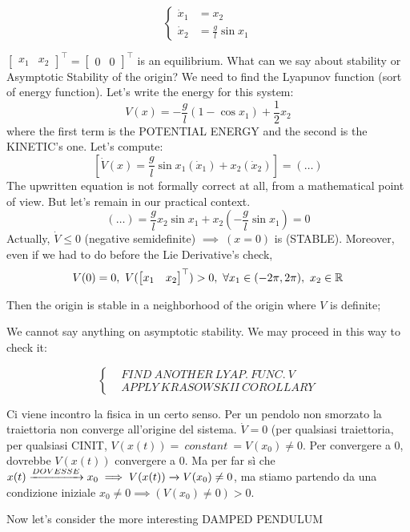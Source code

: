 \[
	\left\{
	\begin{aligned}
	\dot{x}_1 &= x_2 \\
	\dot{x}_2 &= \frac{g}{l}\sin{x_1}
	\end{aligned} 
	\right.
\]

$\begin{bmatrix}x_1 & x_2\end{bmatrix}^\top = \begin{bmatrix}0 & 0\end{bmatrix}^\top$ is an equilibrium. What can  we say about stability or Asymptotic Stability of the origin? We need to find the Lyapunov function (sort of energy function). Let's write the energy for this system:
\[
	V(x) = -\frac{g}{l}(1-\cos{x_1}) + \frac{1}{2}x_2
\]
where the first term is the POTENTIAL ENERGY and the second is the KINETIC's one. Let's compute:
\[ 
	[\dot{V}(x) = \frac{g}{l}\sin{x_1}(\dot{x}_1) + x_2(\dot{x}_2)] = (\dots)
\]
The upwritten equation is not formally correct at all, from a mathematical point of view. But let's remain in our practical context. 
\[
	(\dots) = \frac{g}{l}x_2\sin{x_1} + x_2(-\frac{g}{l}\sin{x_1}) = 0
\]
Actually, $\dot{V} \leq 0$ (negative semidefinite) $\implies\ (x=0)$ is (STABLE). Moreover, even if we had to do before the Lie Derivative's check,
\[
	V(0) = 0,\ V(\begin{bmatrix}x_1 & x_2\end{bmatrix}^\top) > 0,\ \forall x_1 \in (-2\pi,2\pi),\ x_2 \in \mathbb{R}
\] 

Then the origin is stable in a neighborhood of the origin where $V$ is definite;

We cannot say anything on asymptotic stability. We may proceed in this way to check it:

\[
	\left\{
	\begin{aligned}
	&FIND\ ANOTHER\ LYAP.\ FUNC.\ V \\
	&APPLY\ KRASOWSKII\ COROLLARY
	\end{aligned} 
	\right.
\]


Ci viene incontro la fisica in un certo senso. Per un pendolo non smorzato la traiettoria non converge all'origine del sistema. $\dot{V} = 0$ (per qualsiasi traiettoria, per qualsiasi CINIT, $V(x(t)) =\ constant\ = V(x_0) \neq 0$. Per convergere a 0, dovrebbe $V(x(t))$ convergere a 0. Ma per far sì che $x(t) \tendsto{DOVESSE} x_0 \implies V(x(t)) \tendsto{} V(x_0) \neq 0$, ma stiamo partendo da una condizione iniziale $x_0 \neq 0 \implies (V(x_0) \neq 0) > 0$.

Now let's consider the more interesting {DAMPED PENDULUM}


